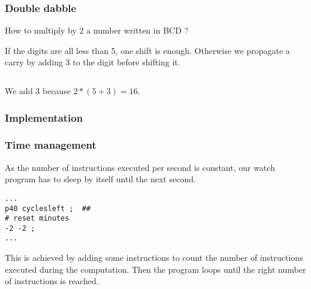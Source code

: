 \documentclass{beamer}
\begin{document}
\begin{frame}
    \frametitle{Double dabble}

    How to multiply by 2 a number written in BCD ?

    If the digits are all less than 5, one shift is enough.
    Otherwise we propagate a carry by adding 3 to the digit before shifting it.

    \begin{columns}[t]
        \begin{column}[T]{5cm}
            \vspace{1cm}
        \end{column}
        \begin{column}[T]{5cm}
            \vspace{1cm}

        \end{column}
    \end{columns}

    We add 3 because $2*(5 + 3) = 16$.
\end{frame}

\begin{frame}
    \frametitle{Implementation}

    

\end{frame}


\begin{frame}[fragile]
    \frametitle{Time management}

    As the number of instructions executed per second is constant, our watch program has to sleep by itself until
    the next second.

    \begin{verbatim}
...
p40 cyclesleft ;  ##
# reset minutes
-2 -2 ;
...
    \end{verbatim}

    This is achieved by adding some instructions to count the number of instructions executed during the computation.
    Then the program loops until the right number of instructions is reached.
\end{frame}
\end{document}
